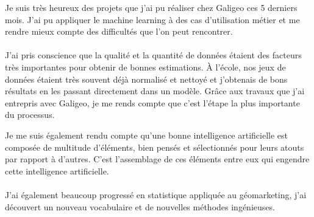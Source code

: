 
Je suis très heureux des projets que j'ai pu réaliser chez Galigeo ces 5 derniers mois. J'ai pu appliquer le machine learning à des cas d'utilisation métier et me rendre mieux compte des difficultés que l'on peut rencontrer.

\paragraph*{}

J'ai pris conscience que la qualité et la quantité de données étaient des facteurs très importantes pour obtenir de bonnes estimations. À l'école, nos jeux de données étaient très souvent déjà normalisé et nettoyé et j'obtenais de bons résultats en les passant directement dans un modèle. Grâce aux travaux que j'ai entrepris avec Galigeo, je me rends compte que c'est l'étape la plus importante du processus.

Je me suis également rendu compte qu'une bonne intelligence artificielle est composée de multitude d'éléments, bien pensés et sélectionnés pour leurs atouts par rapport à d'autres. C'est l'assemblage de ces éléments entre eux qui engendre cette intelligence artificielle.


\paragraph{}

J'ai également beaucoup progressé en statistique appliquée au géomarketing, j'ai découvert un nouveau vocabulaire et de nouvelles méthodes ingénieuses.
